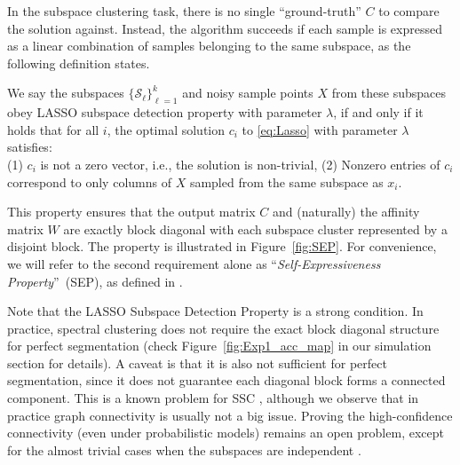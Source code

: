 \documentclass[twoside,11pt]{article}
\numberwithin{equation}{section}
\begin{document}
In the subspace clustering task, there is no single ``ground-truth'' $C$ to compare the solution against. Instead, the algorithm succeeds if each sample is expressed as a linear combination of samples belonging to the same subspace, as the following definition states.
\begin{definition}\label{def:lasso_detection}
We say the subspaces $\{\mathcal{S}_{\ell}\}_{\ell=1}^{k}$ and noisy sample points $X$ from these subspaces obey LASSO subspace detection property with parameter $\lambda$, if and only if it holds that for all $i$, the optimal solution $c_i$ to \eqref{eq:Lasso} with parameter $\lambda$ satisfies:\\
\indent (1) $c_i$ is not a zero vector, i.e., the solution is non-trivial,
\indent (2) Nonzero entries of $c_i$ correspond to only columns of $X$ sampled from the same subspace as $x_i$.
\end{definition}
This property ensures that the output matrix $C$ and (naturally) the affinity matrix $W$ are exactly block diagonal with each subspace cluster represented by a disjoint block.  The property is illustrated in Figure~\ref{fig:SEP}. For convenience, we will refer to the second requirement alone as ``\emph{Self-Expressiveness Property}''~(SEP), as defined in \citet{elhamifar2012ssc_journal}.

Note that the LASSO Subspace Detection Property is a strong condition. In practice, spectral clustering does not require the exact block diagonal structure for perfect segmentation (check Figure~\ref{fig:Exp1_acc_map} in our simulation section for details). A caveat is that it is also not sufficient for perfect segmentation, since it does not guarantee each diagonal block forms a connected component. This is a known problem for SSC \citep{nasihatkon2011graph}, although we observe that in practice graph connectivity is usually not a big issue. Proving the high-confidence connectivity (even under probabilistic models) remains an open problem, except for the almost trivial cases when the subspaces are independent \citep{liu2013LRR, wang2013provable}.
\end{document}
